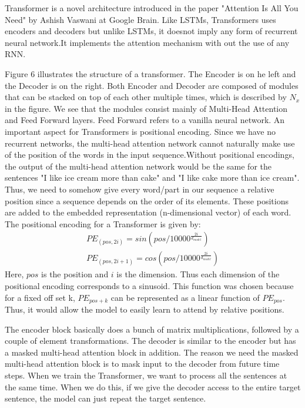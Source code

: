 \documentclass[12pt,a4paper]{article}
\numberwithin{equation}{section}
\begin{document}
Transformer is a novel architecture introduced in the paper "Attention Is All You Need" by Ashish Vaswani at Google Brain. Like LSTMs, Transformers uses encoders and decoders but unlike LSTMs, it doesnot imply any form of recurrent neural network.It implements the attention mechanism with out the use of any RNN. 

Figure 6 illustrates the structure of a transformer. The Encoder is on he left and the Decoder is on the right. Both Encoder and Decoder are composed of modules that can be stacked on top of each other multiple times, which is described by $N_x$ in the figure. We see that the modules consist mainly of Multi-Head Attention and Feed Forward layers. Feed Forward refers to a vanilla neural network. 
An important aspect for Transformers is positional encoding. Since we have no recurrent networks, the multi-head attention network cannot naturally make use of the position of the words in the input sequence.Without positional encodings, the output of the multi-head attention network would be the same for the sentences "I like ice cream more than cake" and "I like cake more than ice cream". Thus, we need to somehow give every word/part in our sequence a relative position since a sequence depends on the order of its elements.  These positions are added to the embedded representation (n-dimensional vector) of each word. 
The positional encoding for a Transformer is given by:
\begin{align*}
    PE_{(pos, 2i) }= sin(pos/10000^{\frac{2i}{d_{model}}})\\
    PE_{(pos, 2i+1) }= cos(pos/10000^{\frac{2i}{d_{model}}})
    \end{align*}
Here, $pos$ is the position and $i$ is the dimension. Thus each dimension of the positional encoding corresponds to a sinusoid. This function was chosen because for a fixed off set k, $PE_{pos + k} $ can be represented as a linear function of $PE_{pos} $. Thus, it would allow the model  to easily learn to attend by relative positions.

The encoder block basically does a bunch of matrix multiplications, followed by a couple of element transformations. The decoder is similar to the encoder but has a masked multi-head attention block in addition. The reason we need the masked multi-head attention block is to mask input to the decoder from future time steps. When we train the Transformer, we want to process all the sentences at the same time. When we do this, if we give the decoder access to the entire target sentence, the model can just repeat the target sentence. 
\end{document}
